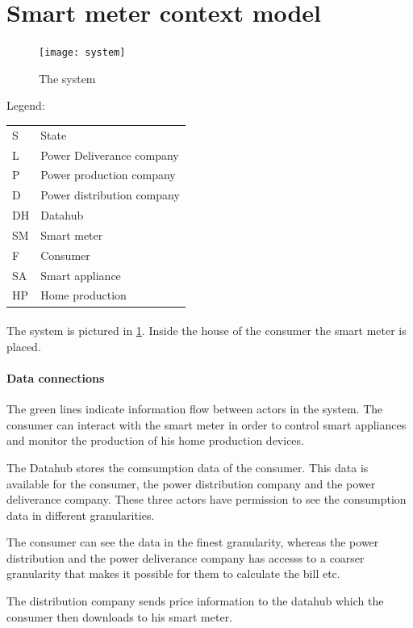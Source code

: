 \section{Smart meter context model}

\begin{figure}
  \texttt{[image: system]}
  \caption{The system}
  \label{system}
\end{figure}
Legend:

\begin{tabular}{l | l}
  S  & State \\
  L & Power Deliverance company\\
  P & Power production company\\
  D & Power distribution company\\
  DH & Datahub \\
  SM & Smart meter\\
  F & Consumer\\
  SA & Smart appliance\\
  HP & Home production\\
\end{tabular}


\paragraph{} The system is pictured in \cref{system}.
Inside the house of the consumer the smart meter is placed.

\paragraph{Data connections}
The green lines indicate information flow between actors in the system.
The consumer can interact with the smart meter in order to control smart appliances and monitor the production of his home production devices.

The Datahub stores the comsumption data of the consumer.
This data is available for the consumer, the power distribution company and the power deliverance company.
These three actors have permission to see the consumption data in different granularities.

The consumer can see the data in the finest granularity, whereas the power distribution and the power deliverance company has accesss to a coarser granularity that makes it possible for them to calculate the bill etc.

The distribution company sends price information to the datahub which the consumer then downloads to his smart meter.

